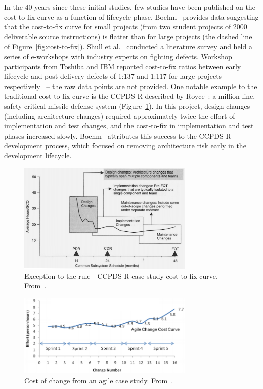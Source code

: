 In the 40 years since these initial studies, few studies have been published on the cost-to-fix curve as a function of lifecycle phase. Boehm~\cite{Boehm80} provides data suggesting that the cost-to-fix curve for small projects (from two student projects of 2000 deliverable source instructions) is flatter than for large projects (the dashed line of Figure~\ref{fig:cost-to-fix}). Shull et al.~\cite{Shull02} conducted a literature survey and held a series of e-workshops with industry experts on fighting defects. Workshop participants from Toshiba and IBM reported cost-to-fix ratios between early lifecycle and post-delivery defects of 1:137 and 1:117 for large projects respectively~\cite{Shull02} -- the raw data points are not provided. One notable example to the traditional cost-to-fix curve is the CCPDS-R described by Royce~\cite{Royce98}: a million-line, safety-critical missile defense system (Figure~\ref{fig:royce}). In this project, design changes (including architecture changes) required approximately twice the effort of implementation and test changes, and the cost-to-fix in implementation and test phases increased slowly. Boehm~\cite{Boehm10} attributes this success to the CCPDS-R development process, which focused on removing architecture risk early in the development lifecycle.

\begin{figure}[!t]
 \includegraphics[width=3.3in]{img/Royce98.png}
 \caption{Exception to the rule - CCPDS-R case study cost-to-fix curve. From~\cite{Royce98}.}\label{fig:royce}
 \end{figure}
 
\begin{figure}[!t]
 \includegraphics[width=3.3in]{img/clutterbuck.png}
 \caption{Cost of change from an agile case study. From~\cite{Clutterbuck09}.}\label{fig:clutterbuck}
 \end{figure}
 
